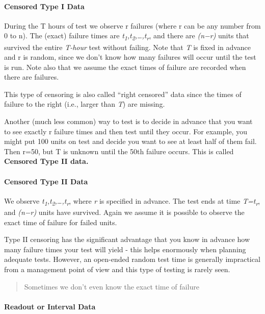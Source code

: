 \documentclass[]{book}
\let\oldparagraph\paragraph
\renewcommand{\paragraph}[1]{\oldparagraph{#1}\mbox{}}
\theoremstyle{definition}
\theoremstyle{definition}
\theoremstyle{definition}
\theoremstyle{remark}
\begin{document}
\paragraph{Censored Type I Data}\label{censored-type-i-data}

During the T hours of test we observe r failures (where r can be any
number from 0 to n). The (exact) failure times are
\emph{t\textsubscript{1},t\textsubscript{2},\ldots{},t\textsubscript{r}},
and there are \emph{(n−r)} units that survived the entire \emph{T-hour}
test without failing. Note that \emph{T} is fixed in advance and r is
random, since we don't know how many failures will occur until the test
is run. Note also that we assume the exact times of failure are recorded
when there are failures.

This type of censoring is also called ``right censored'' data since the
times of failure to the right (i.e., larger than \emph{T}) are missing.

Another (much less common) way to test is to decide in advance that you
want to see exactly r failure times and then test until they occur. For
example, you might put 100 units on test and decide you want to see at
least half of them fail. Then r=50, but T is unknown until the 50th
failure occurs. This is called \textbf{Censored Type II data.}

\paragraph{Censored Type II Data}\label{censored-type-ii-data}

We observe
\emph{t\textsubscript{1},t\textsubscript{2},\ldots{},t\textsubscript{r}},
where \emph{r} is specified in advance. The test ends at time
\emph{T=t\textsubscript{r}}, and \emph{(n−r)} units have survived. Again
we assume it is possible to observe the exact time of failure for failed
units.

Type II censoring has the significant advantage that you know in advance
how many failure times your test will yield - this helps enormously when
planning adequate tests. However, an open-ended random test time is
generally impractical from a management point of view and this type of
testing is rarely seen.

\begin{quote}
Sometimes we don't even know the exact time of failure
\end{quote}

\paragraph{Readout or Interval Data}\label{readout-or-interval-data}
\end{document}
